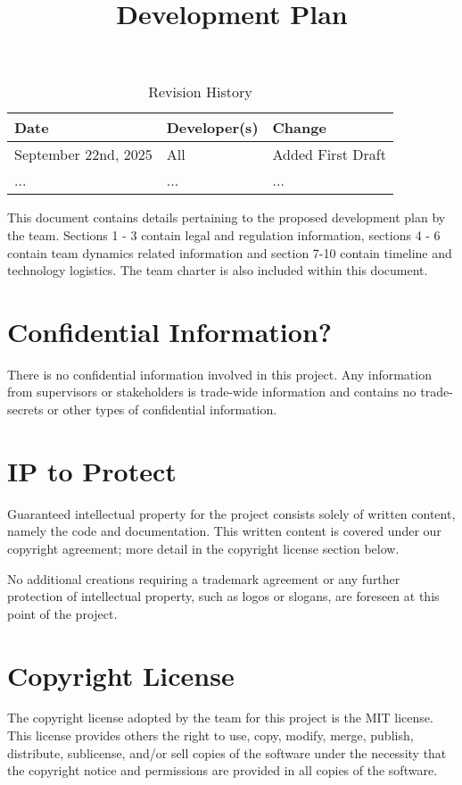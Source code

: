 \documentclass{article}
\title{Development Plan\\\progname}
\author{\authname}
\date{}
\begin{document}
\maketitle

\begin{table}[hp]
\caption{Revision History} \label{TblRevisionHistory}
\begin{tabularx}{\textwidth}{llX}
\toprule
\textbf{Date} & \textbf{Developer(s)} & \textbf{Change}\\
\midrule
September 22nd, 2025 & All & Added First Draft \\
... & ... & ...\\
\bottomrule
\end{tabularx}
\end{table}

\newpage{}


This document contains details pertaining to the proposed development plan by the team.
Sections 1 - 3 contain legal and regulation information, sections 4 - 6 contain team dynamics related information and 
section 7-10 contain timeline and technology logistics. The team charter is also included within this document. \\


\section{Confidential Information?}
There is no confidential information involved in this project. Any information
from supervisors or stakeholders is trade-wide information and contains
no trade-secrets or other types of confidential information.

\section{IP to Protect}
Guaranteed intellectual property for the project consists solely of written
content, namely the code and documentation. This written content is covered
under our copyright agreement; more detail in the copyright license section
below.

No additional creations requiring a trademark agreement or any further
protection of intellectual property, such as logos or slogans, are foreseen
at this point of the project.

\section{Copyright License}
The copyright license adopted by the team for this project is the MIT license.
This license provides others the right to use, copy, modify, merge, publish,
distribute, sublicense, and/or sell copies of the software under the necessity
that the copyright notice and permissions are provided in all copies of the software.
\end{document}
